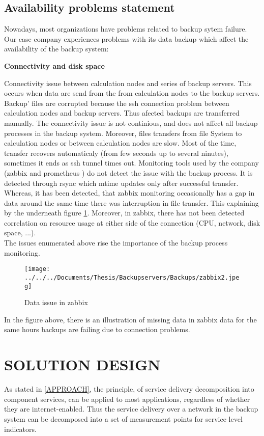 \documentclass[english]{tktltiki2}
\theoremstyle{definition}
\theoremstyle{remark}
\begin{document}
\subsection{Availability problems statement}
Nowadays, most organizations have problems related to backup sytem 
failure. Our case company experiences problems with its data backup which affect the availability of the backup system:\\
\begin{flushleft}
\textbf{Connectivity and disk space}
\end{flushleft}
Connectivity issue between calculation nodes and  series of backup servers. This occurs  when data are send from the  from calculation nodes to the backup servers.
Backup’ files are corrupted because the ssh connection problem between calculation nodes and backup servers. Thus afected backups are transferred manually.
The connectivity issue is not continious, and does not affect all backup processes in the backup system. Moreover, files transfers from file System to calculation nodes or between calculation nodes are slow.
Most of the time, transfer recovers automaticaly (from few seconds up to several ninutes), sometimes it ends as ssh tunnel times out. Monitoring tools used by the company (zabbix \cite{10.5555/3074244} and prometheus \cite{turnbull2018monitoring}) do not detect the issue with the backup process. It is detected through rsync which mtime updates only after successful transfer.
Whereas, it has been detected, that zabbix monitoring occasionally has a gap in data around the same time there was interruption in file transfer. This explaining by the underneath figure \ref{fig:zabbix}.
Moreover, in zabbix, there has not been detected correlation on resource usage at either side of the connection (CPU, network, disk space, ...).\\
The issues enumerated above rise the importance of the backup process monitoring.



\begin{figure}[h!]
\texttt{[image: ../../../Documents/Thesis/Backupservers/Backups/zabbix2.jpeg]} 
\caption{Data issue in zabbix}
\label{fig:zabbix} 
\end{figure}
\pagebreak
In the figure above, there is an illustration of missing data in zabbix data for the same hours backups are failing due to connection problems.

\section{SOLUTION DESIGN }
As stated in \ref{APPROACH}, the principle, of service delivery decomposition into component services, can be applied to most
applications, regardless of whether they are internet-enabled. 
Thus the  service delivery over a network in the backup system can be decomposed into a set of measurement points for service level indicators.
\end{document}
